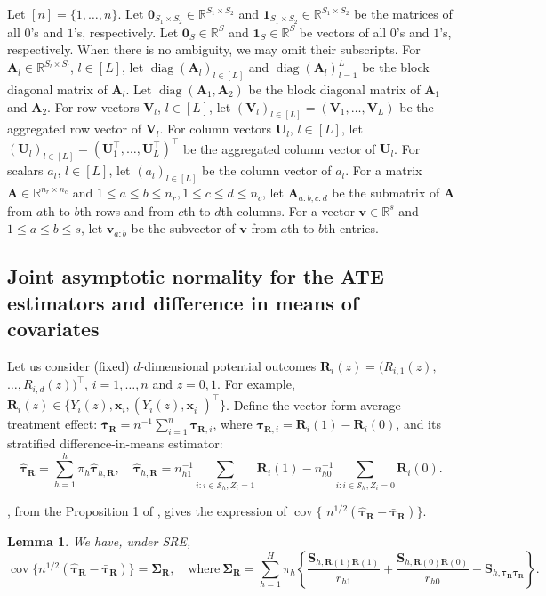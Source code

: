 \documentclass[12pt]{article}
\newtheorem{lemma}{Lemma}
\newcommand{\cov}{\operatorname{cov}}
\newcommand{\diag}{\operatorname{diag}}
\newcommand{\ms}{\mathcal{S}}
\newcommand{\bs}{\boldsymbol}
\begin{document}
Let $[n] = \{1,\ldots,n\}$. Let $\bs{0}_{S_1\times S_2} \in \mathbb{R}^{S_1\times S_2}$ and $\bs{1}_{S_1\times S_2} \in \mathbb{R}^{S_1\times S_2}$ be the matrices of all $0$'s and $1$'s, respectively. Let $\bs{0}_{S}\in \mathbb{R}^{S}$ and $\bs{1}_{S} \in \mathbb{R}^{S}$ be vectors of all $0$'s and $1$'s, respectively. When there is no ambiguity, we may omit their subscripts. For $\bs{A}_l \in \mathbb{R}^{S_l\times S_l}$, $l\in [L]$, let $\diag(\bs{A}_l)_{l\in [L]}$ and $\diag(\bs{A}_l)_{l=1}^L$ be the block diagonal matrix of $\bs{A}_l$. Let $\diag(\bs{A}_1,\bs{A}_2)$ be the block diagonal matrix of $\bs{A}_1$ and $\bs{A}_2$. For row vectors $\bs{V}_l$, $l\in [L]$, let $(\bs{V}_l)_{l\in [L]} = (\bs{V}_1,\ldots,\bs{V}_L)$ be the aggregated row vector of $\bs{V}_l$. For column vectors $\bs{U}_l$, $l\in [L]$, let $(\bs{U}_l)_{l\in [L]} = (\bs{U}_1^\top,\ldots,\bs{U}_L^\top)^\top$ be the aggregated column vector of $\bs{U}_l$. For scalars $a_l$, $l\in [L]$, let $(a_l)_{l\in [L]}$ be the column vector of $a_l$. For a matrix $\bs{A} \in \mathbb{R}^{n_r\times n_c}$ and $1\leq a\leq b \leq n_r, 1\leq c\leq d \leq n_c$, let $\bs{A}_{a:b,c:d}$ be the submatrix of $\bs{A}$ from $a$th to $b$th rows and from $c$th to $d$th columns. For a vector $\bs{v} \in \mathbb{R}^{s}$ and $1\leq a\leq b \leq s$, let $\bs{v}_{a:b}$ be the subvector of $\bs{v}$ from $a$th to $b$th entries.
 

\subsection{Joint asymptotic normality for 
the ATE estimators and difference in means of covariates}
 
 Let us consider (fixed) $d$-dimensional potential outcomes $\bs{R}_i(z)=(R_{i, 1}(z), $ $\ldots, R_{i, d}(z))^\top$, $i=1, \ldots, n$ and $z=0,1$. For example, $\bs{R}_i(z) \in \{Y_i(z), \bs{x}_i, (Y_i(z), \bs{x}_i^\top)^\top\}$. Define the vector-form average treatment effect: $\bar{\bs{\tau}}_{\bs{R}} = n^{-1}\sum_{i=1}^n \bs{\tau}_{\bs{R},i}$, where $\bs{\tau}_{\bs{R},i} = \bs{R}_i(1)-\bs{R}_i(0)$, and its stratified difference-in-means estimator: \[\hat{\bs{\tau}}_{\bs{R}} = \sum_{h=1}^h \pi_{h}\hat{\bs{\tau}}_{h,\bs{R}},\quad \hat{\bs{\tau}}_{h,\bs{R}} = n_{h1}^{-1}\sum_{i:i\in\ms_h, Z_i=1}\bs{R}_i(1) - n_{h0}^{-1}\sum_{i:i\in\ms_h, Z_i=0}\bs{R}_i(0). \]

, from the Proposition 1 of \cite{wang2021rerandomization}, gives the expression of $\cov\{$ $ n^{1 / 2}\left(\hat{\bs{\tau}}_{\bs{R}}-\bar{\bs{\tau}}_{\bs{R}}\right)\}$. 
\begin{lemma}
\label{lem:covariance-of-hat-tau-vector-sre}
We have, under SRE,
$$
\cov\{n^{1 / 2}\left(\hat{\bs{\tau}}_{\bs{R}}-\bar{\bs{\tau}}_{\bs{R}}\right)\}=\bs{\Sigma}_{\bs{R}},\quad \text{where}~\bs{\Sigma}_{\bs{R}} =\sum_{h=1}^H \pi_{h}\left\{\frac{\bs{S}_{h, \bs{R}(1)\bs{R}(1)}}{r_{h1}}+\frac{\bs{S}_{h, \bs{R}(0) \bs{R}(0)}}{r_{h0}}-\bs{S}_{h, \bs{\tau_R} \bs{\tau_R}}\right\} .
$$
\end{lemma}
\end{document}
